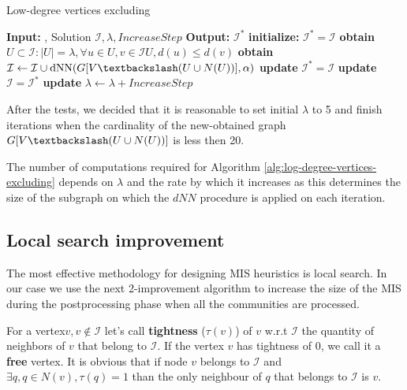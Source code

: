 \begin{algorithm}
\caption{Low-degree vertices excluding}\label{alg:log-degree-vertices-excluding}
\begin{algorithmic}
\State \textbf{Input:} \graphG, Solution $\mathcal{I},\lambda, IncreaseStep$
\State \textbf{Output:} $\mathcal{I}^*$
\State \textbf{initialize:} $\mathcal{I}^* = \mathcal{I}$
    \State \textbf{obtain} $U \subset \mathcal{I}:|U|=\lambda,\forall u \in U, v \in \mathcal{I}  U,d(u) \leq d(v)$
    \State \textbf{obtain} $\mathcal{I}\leftarrow \mathcal{I}\cup \text{dNN}(G[V\textbackslash(U\cup N(U))],\alpha)$
        \State \textbf{update} $\mathcal{I}^* = \mathcal{I}$ 
    \EndIf
        \State \textbf{update} $\mathcal{I} = \mathcal{I}^*$ 
    \EndIf
    \State \textbf{update} $\lambda \leftarrow \lambda + IncreaseStep$
\EndWhile
\end{algorithmic}
\end{algorithm}

After the tests, we decided that it is reasonable to set initial $\lambda$ to 5 and finish iterations when the cardinality of the new-obtained graph $G[V\textbackslash(U\cup N(U))]$ is less then 20. 

The number of computations required for Algorithm \ref{alg:log-degree-vertices-excluding} depends on $\lambda$ and the
rate by which it increases as this determines the size of the subgraph on which the $dNN$ procedure is applied on each iteration.

\subsection{Local search improvement}
The most effective methodology for designing MIS heuristics is local search. In our case we use the next 2-improvement algorithm \cite{local-search} to increase the size of the MIS during the postprocessing phase when all the communities are processed.

For a vertex$v, v\notin \mathcal{I}$ let's call \textbf{tightness} ($\tau(v)$) of $v$ w.r.t $\mathcal{I}$ the quantity of neighbors of $v$ that belong to $\mathcal{I}$. If the vertex $v$ has tightness of 0, we call it a \textbf{free} vertex.
It is obvious that if node $v$ belongs to $\mathcal{I}$ and $\exists q, q \in N(v), \tau(q) = 1$ than the only neighbour of $q$ that belongs to $\mathcal{I}$ is $v$.


